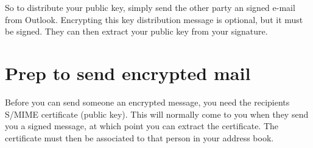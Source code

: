 \documentclass[pdftex,12pt,titlepage=false]{scrartcl}
\begin{document}
So to distribute your public key, simply send the other party an
signed e-mail from Outlook.  Encrypting this key distribution message
is optional, but it must be signed.  They can then extract your public
key from your signature.

\section{Prep to send encrypted mail%
}
Before you can send someone an encrypted message, you need the
recipients S/MIME certificate (public key).  This will normally come
to you when they send you a signed message, at which point you can
extract the certificate.  The certificate must then be associated to
that person in your address book.
\end{document}
